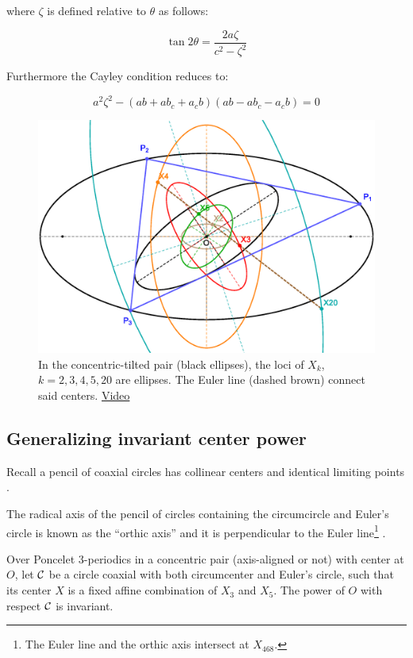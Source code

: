 where $\zeta$ is defined relative to $\theta$ as follows:

\[\tan{2\theta}=\frac{2 a\zeta}{c^2 - \zeta^2}\]

Furthermore the Cayley condition reduces to:

\[a^2 \zeta^2 - (a b + a b_c + a_c b)(a b - a b_c - a_c b)=0\]

\begin{figure}
     \includegraphics[width=\textwidth]{pics/0080_n3_concentric_conics.eps}
     \caption{In the concentric-tilted pair (black ellipses), the loci of $X_k$, $k=2,3,4,5,20$ are ellipses. The Euler line (dashed brown) connect said centers. \href{https://youtu.be/hpb7ZgKWjUY}{Video}}
     \label{fig:concentric-xns}
 \end{figure}

\subsection*{Generalizing invariant center power}

Recall a pencil of coaxial circles has collinear centers and identical limiting points \cite[Coaxal Circles]{mw}.

The radical axis of the pencil of circles containing the circumcircle and Euler's circle is known as the ``orthic axis'' and it is perpendicular to the Euler line\footnote{The Euler line and the orthic axis intersect at $X_{468}$.} \cite[Orthic Axis]{mw}.

\begin{proposition}
Over Poncelet 3-periodics in a concentric pair (axis-aligned or not) with center at $O$, let $\mathcal{C}$ be a circle coaxial with both circumcenter and Euler's circle, such that its center $X$ is a fixed affine combination of $X_3$ and $X_5$. The power of $O$ with respect $\mathcal{C}$ is invariant.
\label{prop:coaxial}
\end{proposition}

